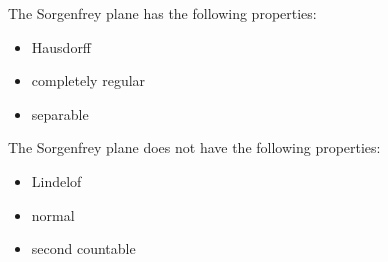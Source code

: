 \documentclass[12pt]{article}
\begin{document}
The Sorgenfrey plane has the following properties:

\begin{itemize}
\item Hausdorff
\item completely regular
\item separable
\end{itemize}

The Sorgenfrey plane does not have the following properties:
\begin{itemize}
\item Lindelof
\item normal
\item second countable
\end{itemize}


\end{document}
